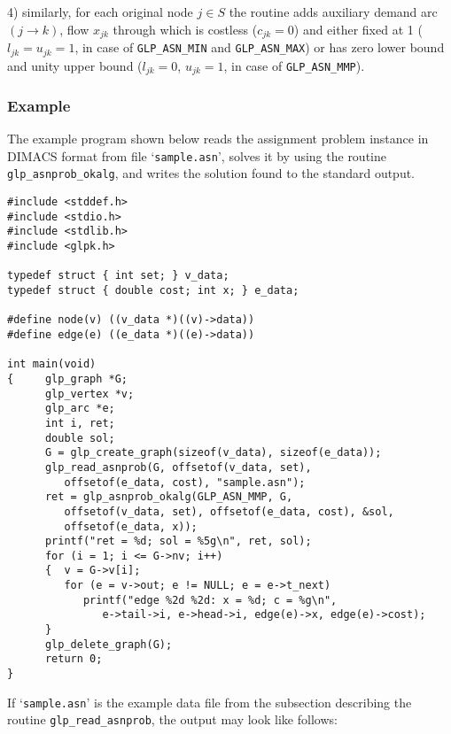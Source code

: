 4) similarly, for each original node $j\in S$ the routine adds
auxiliary demand arc $(j\rightarrow k)$, flow $x_{jk}$ through which is
costless ($c_{jk}=0$) and either fixed at 1 ($l_{jk}=u_{jk}=1$, in case
of \verb|GLP_ASN_MIN| and \verb|GLP_ASN_MAX|) or has zero lower bound
and unity upper bound ($l_{jk}=0$, $u_{jk}=1$, in case of
\verb|GLP_ASN_MMP|).

\subsubsection*{Example}

The example program shown below reads the assignment problem instance
in DIMACS format from file `\verb|sample.asn|', solves it by using the
routine \verb|glp_asnprob_okalg|, and writes the solution found to the
standard output.

\begin{footnotesize}
\begin{verbatim}
#include <stddef.h>
#include <stdio.h>
#include <stdlib.h>
#include <glpk.h>

typedef struct { int set; } v_data;
typedef struct { double cost; int x; } e_data;

#define node(v) ((v_data *)((v)->data))
#define edge(e) ((e_data *)((e)->data))

int main(void)
{     glp_graph *G;
      glp_vertex *v;
      glp_arc *e;
      int i, ret;
      double sol;
      G = glp_create_graph(sizeof(v_data), sizeof(e_data));
      glp_read_asnprob(G, offsetof(v_data, set),
         offsetof(e_data, cost), "sample.asn");
      ret = glp_asnprob_okalg(GLP_ASN_MMP, G,
         offsetof(v_data, set), offsetof(e_data, cost), &sol,
         offsetof(e_data, x));
      printf("ret = %d; sol = %5g\n", ret, sol);
      for (i = 1; i <= G->nv; i++)
      {  v = G->v[i];
         for (e = v->out; e != NULL; e = e->t_next)
            printf("edge %2d %2d: x = %d; c = %g\n",
               e->tail->i, e->head->i, edge(e)->x, edge(e)->cost);
      }
      glp_delete_graph(G);
      return 0;
}
\end{verbatim}
\end{footnotesize}

If `\verb|sample.asn|' is the example data file from the subsection
describing the routine \verb|glp_read_asnprob|, the output may look
like follows:

